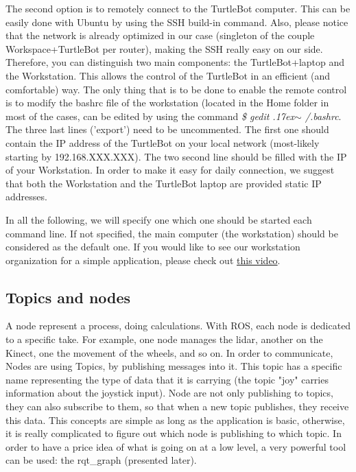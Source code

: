 \documentclass[aps,letterpaper,11pt]{revtex4}
\begin{document}
The second option is to remotely connect to the TurtleBot computer. This can be easily done with Ubuntu by using the SSH build-in command. Also, please notice that the network is already optimized in our case (singleton of the couple Workspace+TurtleBot per router), making the SSH really easy on our side. Therefore, you can distinguish two main components: the TurtleBot+laptop and the Workstation. This allows the control of the TurtleBot in an efficient (and comfortable) way. The only thing that is to be done to enable the remote control is to modify the bashrc file of the workstation (located in the Home folder in most of the cases, can be edited by using the command \textit{\$ gedit {\raise.17ex\hbox{$\scriptstyle\sim$}} /.bashrc}. The three last lines ('export') need to be uncommented. The first one should contain the IP address of the TurtleBot on your local network (most-likely starting by 192.168.XXX.XXX). The two second line should be filled with the IP of your Workstation. In order to make it easy for daily connection, we suggest that both the Workstation and the TurtleBot laptop are provided static IP addresses. 

In all the following, we will specify one which one should be started each command line. If not specified, the main computer (the workstation) should be considered as the default one. If you would like to see our workstation organization for a simple application, please check out \href{https://www.youtube.com/watch?v=OgMLn4ib6k8}{this video}.

\subsection{Topics and nodes}

A node represent a process, doing calculations. With ROS, each node is dedicated to a specific take. For example, one node manages the lidar, another on the Kinect, one the movement of the wheels, and so on. In order to communicate, Nodes are using Topics, by publishing messages into it. This topic has a specific name representing the type of data that it is carrying (the topic "joy" carries information about the joystick input). Node are not only publishing to topics, they can also subscribe to them, so that when a new topic publishes, they receive this data. This concepts are simple as long as the application is basic, otherwise, it is really complicated to figure out which node is publishing to which topic. In order to have a price idea of what is going on at a low level, a very powerful tool can be used: the rqt\_graph (presented later).
\end{document}
